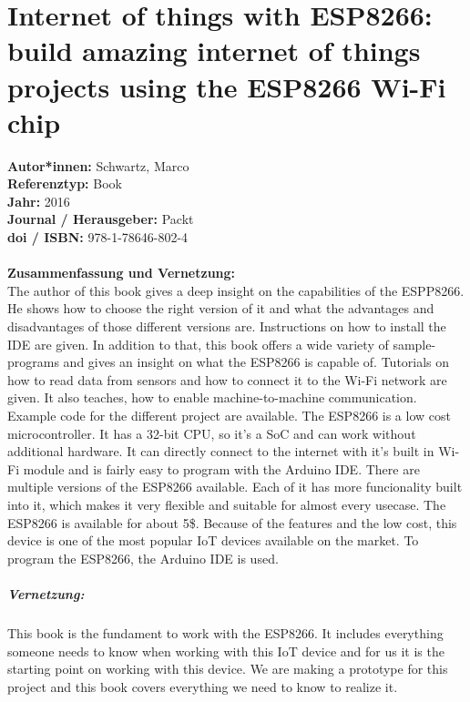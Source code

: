 \documentclass{report}
\begin{document}
{\let\clearpage\relax \chapter{Internet of things with ESP8266: build amazing internet of things projects using the ESP8266 Wi-Fi chip}}
\noindent
\textbf{Autor*innen:} Schwartz,
Marco\\
\textbf{Referenztyp:} Book\\
\textbf{Jahr:} 2016\\
\textbf{Journal / Herausgeber:} Packt\\
\textbf{doi / ISBN:} 978-1-78646-802-4\\\\
\textbf{Zusammenfassung und Vernetzung:}\\
The author of this book gives a deep insight on the capabilities of the ESPP8266. He shows how to choose the right version of it and what the advantages and disadvantages of those different versions are. Instructions on how to install the IDE are given. In addition to that, this book offers a wide variety of sample-programs and gives an insight on what the ESP8266 is capable of. Tutorials on how to read data from sensors and how to connect it to the Wi-Fi network are given. It also teaches, how to enable machine-to-machine communication. Example code for the different project are available. The ESP8266 is a low cost microcontroller. It has a 32-bit CPU, so it's a SoC and can work without additional hardware. It can directly connect to the internet with it's built in Wi-Fi module and is fairly easy to program with the Arduino IDE. There are multiple versions of the ESP8266 available. Each of it has more funcionality built into it, which makes it very flexible and suitable for almost every usecase. The ESP8266 is available for about 5\$. Because of the features and the low cost, this device is one of the most popular IoT devices available on the market. To program the ESP8266, the Arduino IDE is used.\\
\paragraph{Vernetzung:} This book is the fundament to work with the ESP8266. It includes everything someone needs to know when working with this IoT device and for us it is the starting point on working with this device. We are making a prototype for this project and this book covers everything we need to know to realize it.
\end{document}
